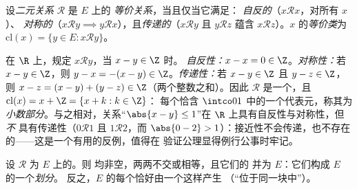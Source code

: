 \begin{definition}[等价关系]\label{def:b1:logic:equiv}
设\emph{二元关系} $\mathcal{R}$ 是 $E$ 上的
\emph{等价关系}，当且仅当它满足：
\emph{自反的}（$x \mathbin{\mathcal{R}} x$，对所有 $x$）、
\emph{对称的}（$x \mathbin{\mathcal{R}} y \implies y
\mathbin{\mathcal{R}} x$），且\emph{传递的}（$x
\mathbin{\mathcal{R}} y$ 且 $y \mathbin{\mathcal{R}} z$ 蕴含 $x
\mathbin{\mathcal{R}} z$）。$x$ 的\emph{等价类}为
$\mathrm{cl}(x) = \{y \in E : x \mathbin{\mathcal{R}} y\}$。
\end{definition}

\begin{example}[检验三条公理]\label{ex:b1:logic:fracpart}
在 $\R$ 上，规定 $x \mathbin{\mathcal{R}} y$，当 $x - y \in \Z$ 时。
\emph{自反性：}$x - x = 0 \in \Z$。\emph{对称性：}若 $x - y
\in \Z$，则 $y - x = -(x - y) \in \Z$。\emph{传递性：}若 $x -
y \in \Z$ 且 $y - z \in \Z$，则 $x - z = (x - y) + (y - z) \in
\Z$（两个整数之和）。因此 $\mathcal R$ 是一个，且 $\mathrm{cl}(x) = x + \Z = \{x + k : k \in \Z\}$：
每个恰含 $\intco01$ 中的一个代表元，称其为
\emph{小数部分}。与之相对，关系“$\abs{x - y}
\leq 1$”在 $\R$ 上具有自反性与对称性，但\emph{不}
具有传递性（$0 \mathbin{\mathcal R} 1$ 且 $1 \mathbin{\mathcal R}
2$，而 $\abs{0 - 2} > 1$）：接近性不会传递，也不存在
的——这是一个有用的反例，值得在
验证公理显得例行公事时牢记。
\end{example}

\begin{theorem}[等价类构成划分]\label{thm:b1:logic:partition}
设 $\mathcal{R}$ 为 $E$ 上的。则
均非空，两两不交或相等，且它们的
并为 $E$：它们构成 $E$ 的一个\emph{划分}。
反之，$E$ 的每个恰好由一个这样产生
（“位于同一块中”）。
\end{theorem}

